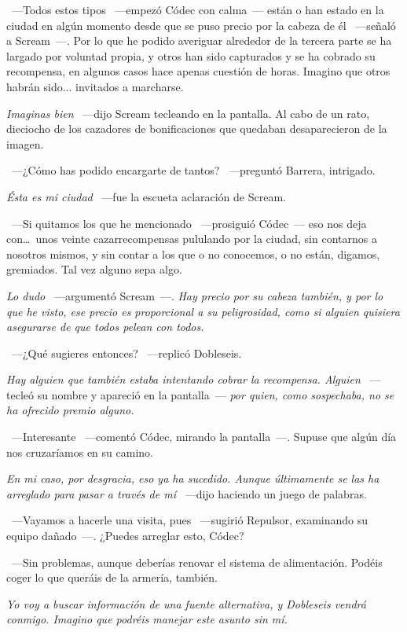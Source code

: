 ~---Todos estos tipos ~---empezó Códec con calma~--- están o han estado en la ciudad en algún momento desde que se puso precio por la cabeza de él ~---señaló a Scream~---. Por lo que he podido averiguar alrededor de la tercera parte se ha largado por voluntad propia, y otros han sido capturados y se ha cobrado su recompensa, en algunos casos hace apenas cuestión de horas. Imagino que otros habrán sido... invitados a marcharse.

\emph{Imaginas bien} ~---dijo Scream tecleando en la pantalla. Al cabo de un rato, dieciocho de los cazadores de bonificaciones que quedaban desaparecieron de la imagen.

~---¿Cómo has podido encargarte de tantos? ~---preguntó Barrera, intrigado.

\emph{Ésta es mi ciudad} ~---fue la escueta aclaración de Scream.

~---Si quitamos los que he mencionado ~---prosiguió Códec~--- eso nos deja con\dots\ unos veinte cazarrecompensas pululando por la ciudad, sin contarnos a nosotros mismos, y sin contar a los que o no conocemos, o no están, digamos, gremiados. Tal vez alguno sepa algo.

\emph{Lo dudo} ~---argumentó Scream~---. \emph{Hay precio por su cabeza también, y por lo que he visto, ese precio es proporcional a su peligrosidad, como si alguien quisiera asegurarse de que todos pelean con todos.}

~---¿Qué sugieres entonces? ~---replicó Dobleseis.

\emph{Hay alguien que también estaba intentando cobrar la recompensa. Alguien} ~---tecleó su nombre y apareció en la pantalla~--- \emph{por quien, como sospechaba, no se ha ofrecido premio alguno.}

~---Interesante ~---comentó Códec, mirando la pantalla~---. Supuse que algún día nos cruzaríamos en su camino.

\emph{En mi caso, por desgracia, eso ya ha sucedido. Aunque últimamente se las ha arreglado para pasar a través de mí} ~---dijo haciendo un juego de palabras.

~---Vayamos a hacerle una visita, pues ~---sugirió Repulsor, examinando su equipo dañado~---. ¿Puedes arreglar esto, Códec?

~---Sin problemas, aunque deberías renovar el sistema de alimentación. Podéis coger lo que queráis de la armería, también.

\emph{Yo voy a buscar información de una fuente alternativa, y Dobleseis vendrá conmigo. Imagino que podréis manejar este asunto sin mí.}

